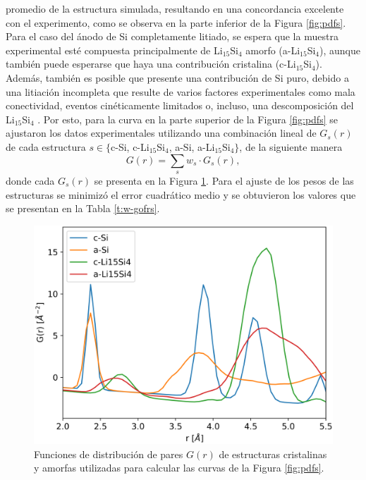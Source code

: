 promedio de la estructura simulada, resultando en una concordancia excelente con 
el experimento, como se observa en la parte inferior de la Figura \ref{fig:pdfs}.
Para el caso del ánodo de Si completamente litiado, se espera que la muestra 
experimental esté compuesta principalmente de Li$_{15}$Si$_4$ amorfo 
(a-Li$_{15}$Si$_4$), aunque también puede esperarse que haya una contribución 
cristalina (c-Li$_{15}$Si$_4$). Además, también es posible que presente una 
contribución de Si puro, debido a una litiación incompleta que resulte de varios 
factores experimentales como mala conectividad, eventos cinéticamente limitados 
o, incluso, una descomposición del Li$_{15}$Si$_4$ \cite{key2009, key2011}. Por 
esto, para la curva en la parte superior de la Figura \ref{fig:pdfs} se 
ajustaron los datos experimentales utilizando una combinación lineal de $G_s(r)$ 
de cada estructura $s \in \lbrace$c-Si, c-Li$_{15}$Si$_4$, a-Si,
a-Li$_{15}$Si$_4\rbrace$, de la siguiente manera 
\begin{equation}\label{eq:contributions}
    G(r) = \sum_s w_s \cdot G_s(r),
\end{equation}
donde cada $G_s(r)$ se presenta en la Figura \ref{fig:gofrs}. Para el 
ajuste de los pesos de las estructuras se minimizó el error cuadrático 
medio y se obtuvieron los valores que se presentan en la Tabla 
\ref{t:w-gofrs}.
\begin{figure}[h!]
    \centering
    \includegraphics[width=.7\textwidth]{Silicio/prediccion/resultados/xray/gofrs.png}
    \caption{Funciones de distribución de pares $G(r)$ de estructuras 
    cristalinas y amorfas utilizadas para calcular las curvas de la Figura 
    \ref{fig:pdfs}.}
    \label{fig:gofrs}
\end{figure}
